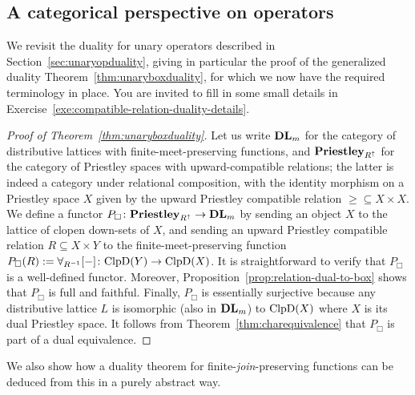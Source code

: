 \subsection*{A categorical perspective on operators}
We revisit the duality for unary operators described in Section~\ref{sec:unaryopduality}, giving in particular the proof of the generalized duality Theorem~\ref{thm:unaryboxduality}, for which we now have the required terminology in place. You are invited to fill in some small details in Exercise~\ref{exe:compatible-relation-duality-details}.
\begin{proof}[Proof of Theorem~\ref{thm:unaryboxduality}]
Let us write $\mathbf{DL}_m$ for the category of distributive lattices with finite-meet-preserving functions, and $\mathbf{Priestley}_{R^{\uparrow}}$ for the category of Priestley spaces with upward-compatible relations; the latter is indeed a category under relational composition, with the identity morphism on a Priestley space $X$ given by the upward Priestley compatible relation ${\geq} \subseteq X \times X$. We define a functor $P_{\Box} \colon \mathbf{Priestley}_{R^{\uparrow}} \to \mathbf{DL}_m$ by sending an object $X$ to the lattice of clopen down-sets of $X$, and sending an upward Priestley compatible relation $R \subseteq X \times Y$ to the finite-meet-preserving function $P_{\Box}(R) := \forall_{R^{-1}}[-] \colon \mathrm{ClpD}(Y) \to \mathrm{ClpD}(X)$. It is straightforward to verify that $P_\Box$ is a well-defined functor. Moreover, Proposition~\ref{prop:relation-dual-to-box} shows that $P_\Box$ is full and faithful. Finally, $P_\Box$ is essentially surjective because any distributive lattice $L$ is isomorphic (also in $\mathbf{DL}_m$) to $\mathrm{ClpD}(X)$ where $X$ is its dual Priestley space. It follows from Theorem~\ref{thm:charequivalence} that $P_{\Box}$ is part of a dual equivalence.
\end{proof}
We also show how a duality theorem for finite-\emph{join}-preserving functions can be deduced from this in a purely abstract way.


